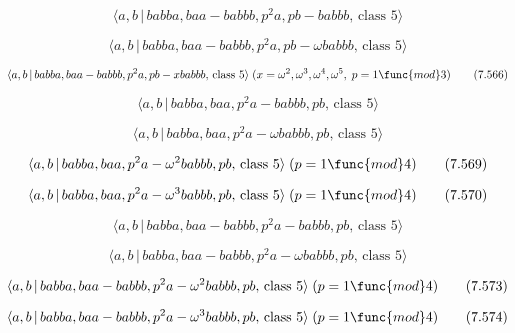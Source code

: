 \documentclass[10pt]{article}
\begin{document}
\begin{equation}
\langle a,b\,|\,babba,baa-babbb,p^2a,pb-babbb,\,\text{class }5\rangle 
\tag{7.564}
\end{equation}

\begin{equation}
\langle a,b\,|\,babba,baa-babbb,p^{2}a,pb-\omega babbb,\,\text{class }%
5\rangle  \tag{7.565}
\end{equation}

\begin{equation}
\langle a,b\,|\,babba,baa-babbb,p^{2}a,pb-xbabbb,\,\text{class }5\rangle
\;(x=\omega ^{2},\omega ^{3},\omega ^{4},\omega ^{5},\;p=1\func{mod}3) 
\tag{7.566}
\end{equation}

\begin{equation}
\langle a,b\,|\,babba,baa,p^2a-babbb,pb,\,\text{class }5\rangle  \tag{7.567}
\end{equation}

\begin{equation}
\langle a,b\,|\,babba,baa,p^{2}a-\omega babbb,pb,\,\text{class }5\rangle 
\tag{7.568}
\end{equation}

\begin{equation}
\langle a,b\,|\,babba,baa,p^{2}a-\omega ^{2}babbb,pb,\,\text{class }5\rangle
\;(p=1\func{mod}4)  \tag{7.569}
\end{equation}

\begin{equation}
\langle a,b\,|\,babba,baa,p^{2}a-\omega ^{3}babbb,pb,\,\text{class }5\rangle
\;(p=1\func{mod}4)  \tag{7.570}
\end{equation}

\begin{equation}
\langle a,b\,|\,babba,baa-babbb,p^2a-babbb,pb,\,\text{class }5\rangle 
\tag{7.571}
\end{equation}

\begin{equation}
\langle a,b\,|\,babba,baa-babbb,p^{2}a-\omega babbb,pb,\,\text{class }%
5\rangle  \tag{7.572}
\end{equation}

\begin{equation}
\langle a,b\,|\,babba,baa-babbb,p^{2}a-\omega ^{2}babbb,pb,\,\text{class }%
5\rangle \;(p=1\func{mod}4)  \tag{7.573}
\end{equation}

\begin{equation}
\langle a,b\,|\,babba,baa-babbb,p^{2}a-\omega ^{3}babbb,pb,\,\text{class }%
5\rangle \;(p=1\func{mod}4)  \tag{7.574}
\end{equation}
\end{document}
